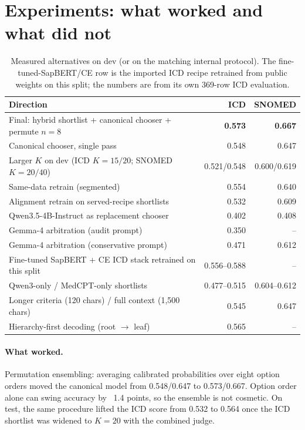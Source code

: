 \documentclass[11pt]{article}
\begin{document}
\section{Experiments: what worked and what did not}
\begin{table}[H]
\centering
\small
\begin{tabularx}{\linewidth}{@{}Xrr@{}}
\toprule
Direction & ICD & SNOMED\\
\midrule
Final: hybrid shortlist + canonical chooser + permute $n{=}8$ & \textbf{0.573} & \textbf{0.667}\\
Canonical chooser, single pass & 0.548 & 0.647\\
Larger $K$ on dev (ICD $K{=}15/20$; SNOMED $K{=}20/40$) & 0.521/0.548 & 0.600/0.619\\
Same-data retrain (segmented) & 0.554 & 0.640\\
Alignment retrain on served-recipe shortlists & 0.532 & 0.609\\
Qwen3.5-4B-Instruct as replacement chooser & 0.402 & 0.408\\
Gemma-4 arbitration (audit prompt) & 0.350 & --\\
Gemma-4 arbitration (conservative prompt) & 0.471 & 0.612\\
Fine-tuned SapBERT + CE ICD stack retrained on this split & 0.556--0.588 & --\\
Qwen3-only / MedCPT-only shortlists & 0.477--0.515 & 0.604--0.612\\
Longer criteria (120 chars) / full context (1{,}500 chars) & 0.545 & 0.647\\
Hierarchy-first decoding (root $\rightarrow$ leaf) & 0.565 & --\\
\bottomrule
\end{tabularx}
\caption{Measured alternatives on dev (or on the matching internal protocol). The
fine-tuned-SapBERT/CE row is the imported ICD recipe retrained from public weights on this
split; the numbers are from its own 369-row ICD evaluation.}
\end{table}

\paragraph{What worked.}
Permutation ensembling: averaging calibrated probabilities over eight option orders moved
the canonical model from 0.548/0.647 to 0.573/0.667. Option order alone can swing accuracy
by ~1.4 points, so the ensemble is not cosmetic. On test, the same procedure lifted the
ICD score from 0.532 to 0.564 once the ICD shortlist was widened to $K{=}20$ with the
combined judge.
\end{document}
